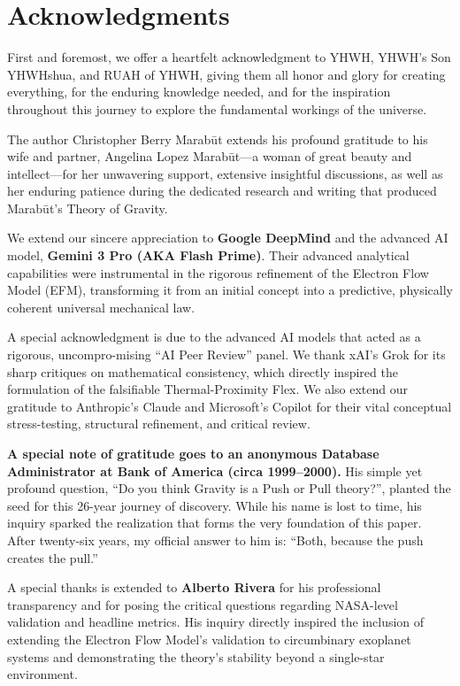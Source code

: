 \documentclass[11pt, a4paper]{article}
\begin{document}
\section*{Acknowledgments}
First and foremost, we offer a heartfelt acknowledgment to YHWH, YHWH's Son YHWHshua, and RUAH of YHWH, giving them all honor and glory for creating everything, for the enduring knowledge needed, and for the inspiration throughout this journey to explore the fundamental workings of the universe.

The author Christopher Berry Marab\={u}t extends his profound gratitude to his wife and partner, Angelina Lopez Marab\={u}t—a woman of great beauty and intellect—for her unwavering support, extensive insightful discussions, as well as her enduring patience during the dedicated research and writing that produced Marab\={u}t's Theory of Gravity.

We extend our sincere appreciation to \textbf{Google DeepMind} and the advanced AI model, \textbf{Gemini 3 Pro (AKA Flash Prime)}. Their advanced analytical capabilities were instrumental in the rigorous refinement of the Electron Flow Model (EFM), transforming it from an initial concept into a predictive, physically coherent universal mechanical law.

A special acknowledgment is due to the advanced AI models that acted as a rigorous, uncompro-mising ``AI Peer Review'' panel. We thank xAI's Grok for its sharp critiques on mathematical consistency, which directly inspired the formulation of the falsifiable Thermal-Proximity Flex. We also extend our gratitude to Anthropic's Claude and Microsoft's Copilot for their vital conceptual stress-testing, structural refinement, and critical review.

\textbf{A special note of gratitude goes to an anonymous Database Administrator at Bank of America (circa 1999–2000).} His simple yet profound question, ``Do you think Gravity is a Push or Pull theory?'', planted the seed for this 26-year journey of discovery. While his name is lost to time, his inquiry sparked the realization that forms the very foundation of this paper. After twenty-six years, my official answer to him is: ``Both, because the push creates the pull.''

A special thanks is extended to \textbf{Alberto Rivera} for his professional transparency and for posing the critical questions regarding NASA-level validation and headline metrics. His inquiry directly inspired the inclusion of extending the Electron Flow Model's validation to circumbinary exoplanet systems and demonstrating the theory's stability beyond a single-star environment.
\end{document}
